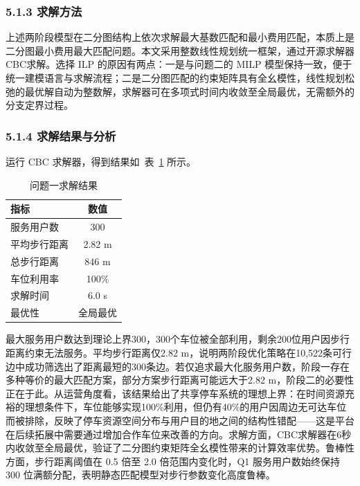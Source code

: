 \documentclass{ctexart}
\begin{document}
\subsubsection*{5.1.3 求解方法}

上述两阶段模型在二分图结构上依次求解最大基数匹配和最小费用匹配，本质上是二分图最小费用最大匹配问题。本文采用整数线性规划\cite{4}统一框架，通过开源求解器 CBC\cite{3}求解。选择 ILP 的原因有两点：一是与问题二的 MILP 模型保持一致，便于统一建模语言与求解流程；二是二分图匹配的约束矩阵具有全幺模性\cite{1}，线性规划松弛的最优解自动为整数解，求解器可在多项式时间内收敛至全局最优，无需额外的分支定界过程。

\subsubsection*{5.1.4 求解结果与分析}

运行 CBC 求解器，得到结果如~表~\ref{tab:q1_result} 所示。

\begin{table}[H]
  \centering
  \caption{问题一求解结果}
  \label{tab:q1_result}
  \begin{tabular}{lc}
    \toprule
    指标     & 数值     \\
    \midrule
    服务用户数  & 300    \\
    平均步行距离 & 2.82 m \\
    总步行距离  & 846 m  \\
    车位利用率  & 100\%  \\
    求解时间   & 6.0 s  \\
    最优性    & 全局最优   \\
    \bottomrule
  \end{tabular}
\end{table}

最大服务用户数达到理论上界300，300个车位被全部利用，剩余200位用户因步行距离约束无法服务。平均步行距离仅2.82 m，说明两阶段优化策略在10,522条可行边中成功筛选出了距离最短的300条边。若仅追求最大化服务用户数，阶段一存在多种等价的最大匹配方案，部分方案步行距离可能远大于2.82 m，阶段二的必要性正在于此。从运营角度看，该结果给出了共享停车系统的理想上界：在时间资源充裕的理想条件下，车位能够实现100\%利用，但仍有40\%的用户因周边无可达车位而被排除，反映了停车资源空间分布与用户目的地之间的结构性错配——这是平台在后续拓展中需要通过增加合作车位来改善的方向。求解方面，CBC求解器在6秒内收敛至全局最优，验证了二分图约束矩阵全幺模性带来的计算效率优势。鲁棒性方面，步行距离阈值在 0.5 倍至 2.0 倍范围内变化时，Q1 服务用户数始终保持 300 位满额分配，表明静态匹配模型对步行参数变化高度鲁棒。
\end{document}

